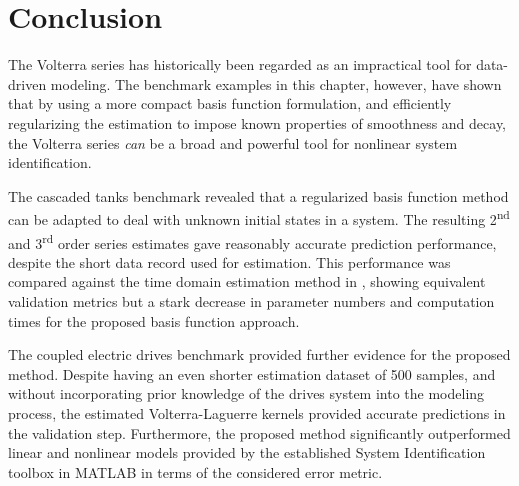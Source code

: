 \section{Conclusion}

The Volterra series has historically been regarded as an impractical tool for data-driven modeling. The benchmark examples in this chapter, however, have shown that by using a more compact basis function formulation, and efficiently regularizing the estimation to impose known properties of smoothness and decay, the Volterra series \emph{can} be a broad and powerful tool for nonlinear system identification. 

The cascaded tanks benchmark revealed that a regularized basis function method can be adapted to deal with unknown initial states in a system. The resulting 2\textsuperscript{nd} and 3\textsuperscript{rd} order series estimates gave reasonably accurate prediction performance, despite the short data record used for estimation. This performance was compared against the time domain estimation method in \cite{Birpoutsoukis2017b}, showing equivalent validation metrics but a stark decrease in parameter numbers and computation times for the proposed basis function approach. 

The coupled electric drives benchmark provided further evidence for the proposed method. Despite having an even shorter estimation dataset of 500 samples, and without incorporating prior knowledge of the drives system into the modeling process, the estimated Volterra-Laguerre kernels provided accurate predictions in the validation step. Furthermore, the proposed method significantly outperformed linear and nonlinear models provided by the established System Identification toolbox in MATLAB in terms of the considered error metric.